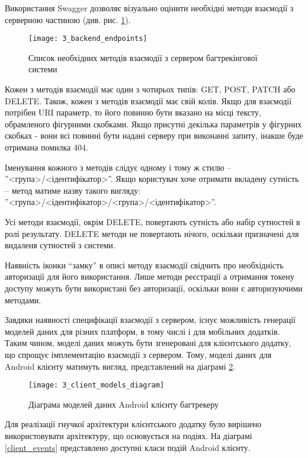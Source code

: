\documentclass[../main.tex]{subfiles}
\begin{document}
		Використання Swagger дозволяє візуально оцінити необхідні методи взаємодії з серверною частиною (див. рис. \ref{available_rest_endpoints}).
		
		\begin{figure}[H]
			\centering
			\texttt{[image: 3\_backend\_endpoints]}
			\caption{Список необхідних методів взаємодії з сервером багтрекінгової системи}
			\label{available_rest_endpoints}
		\end{figure}
		
		Кожен з методів взаємодії має один з чотирьох типів: GET, POST, PATCH або DELETE. Також, кожен з методів взаємодії має свій колів. Якщо для взаємодії потрібен URI параметр, то його повинно бути вказано на місці тексту, обрамленого фігурними скобками. Якщо присутні декілька параметрів у фігурних скобках - вони всі повинні бути надані серверу при виконанні запиту, інакше буде отримана помилка 404.
		
		Іменування кожного з методів слідує одному і тому ж стилю -- ''<група>/<ідентифікатор>''. Якщо користувач хоче отримати вкладену сутність -- метод матиме назву такого вигляду: ''<група>/<ідентифікатор>/<група>/<ідентифікатор>''.
		
		Усі методи взаємодії, окрім DELETE, повертають сутність або набір сутностей в ролі результату. DELETE методи не повертають нічого, оскільки призначені для видаленя сутностей з системи.
		
		Наявність іконки \enquote{замку} в описі методу взаємодії свідчить про необхідність авторизації для його використання. Лише методи реєстрації а отримання токену доступу можуть бути використані без авторизації, оскільки вони є авторизуючими методами.
		
		Завдяки наявності специфікації взаємодії з сервером, існує можливість генерації моделей даних для різних платформ, в тому числі і для мобільних додатків. Таким чином, моделі даних можуть бути згенеровані для клієнтського додатку, що спрощує імплементацію взаємодії з сервером. Тому, моделі даних для Android клієнту матимуть вигляд, представлений на діаграмі \ref{client_models}.
		
		\begin{figure}[H]
			\centering
			\texttt{[image: 3\_client\_models\_diagram]}
			\caption{Діаграма моделей даних Android клієнту багтрекеру}
			\label{client_models}
		\end{figure}
		
		Для реалізації гнучкої архітектури клієнтського додатку було вирішено використовувати архітектуру, що основується на подіях. На діаграмі \ref{client_events} представлено доступні класи подій Android клієнту.
		
\end{document}
